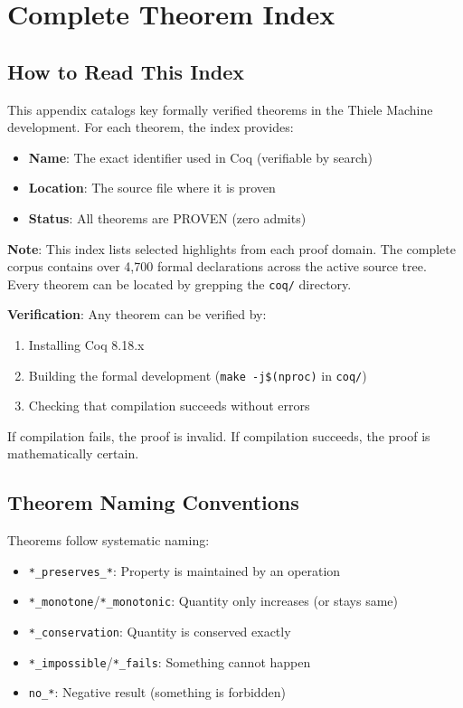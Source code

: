 \section{Complete Theorem Index}

\subsection{How to Read This Index}

This appendix catalogs key formally verified theorems in the Thiele Machine development. For each theorem, the index provides:
\begin{itemize}
    \item \textbf{Name}: The exact identifier used in Coq (verifiable by search)
    \item \textbf{Location}: The source file where it is proven
    \item \textbf{Status}: All theorems are PROVEN (zero admits)
\end{itemize}

\textbf{Note}: This index lists selected highlights from each proof domain. The complete corpus contains over 4,700 formal declarations across the active source tree. Every theorem can be located by grepping the \texttt{coq/} directory.

\textbf{Verification}: Any theorem can be verified by:
\begin{enumerate}
    \item Installing Coq 8.18.x
    \item Building the formal development (\texttt{make -j\$(nproc)} in \texttt{coq/})
    \item Checking that compilation succeeds without errors
\end{enumerate}

If compilation fails, the proof is invalid. If compilation succeeds, the proof is mathematically certain.

\subsection{Theorem Naming Conventions}

Theorems follow systematic naming:
\begin{itemize}
    \item \texttt{*\_preserves\_*}: Property is maintained by an operation
    \item \texttt{*\_monotone}/\texttt{*\_monotonic}: Quantity only increases (or stays same)
    \item \texttt{*\_conservation}: Quantity is conserved exactly
    \item \texttt{*\_impossible}/\texttt{*\_fails}: Something cannot happen
    \item \texttt{no\_*}: Negative result (something is forbidden)
\end{itemize}

